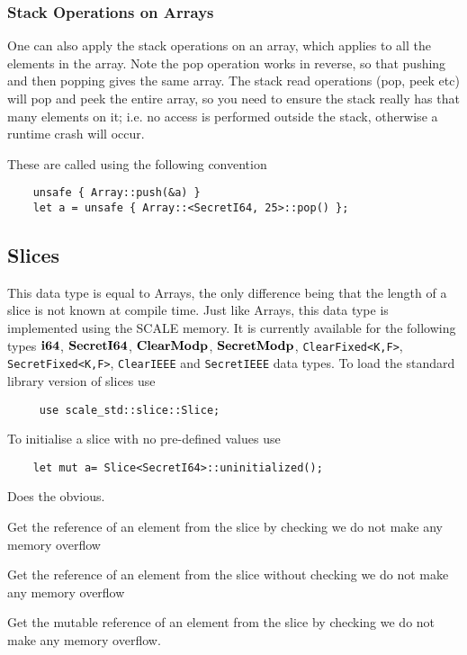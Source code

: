 \subsubsection{Stack Operations on Arrays}
One can also apply the stack operations on an array, which
applies to all the elements in the array.
Note the pop operation works in reverse, so that pushing and
then popping gives the same array.
The stack read operations (pop, peek etc) will pop and peek
the entire array, so you need to ensure the stack really has
that many elements on it; i.e. no access is performed outside
the stack, otherwise a runtime crash will occur.

These are called using the following convention
\begin{lstlisting}
    unsafe { Array::push(&a) }
    let a = unsafe { Array::<SecretI64, 25>::pop() };
\end{lstlisting}

\subsection{Slices}
\label{sec:slices}
This data type is equal to Arrays, the only difference being that the length of a slice is not known at compile time.
Just like Arrays, this data type is implemented using the SCALE memory.
It is currently available for the following types
$\mathbf{i64}$, $\mathbf{SecretI64}$, $\mathbf{ClearModp}$, $\mathbf{SecretModp}$,
\verb|ClearFixed<K,F>|, \verb|SecretFixed<K,F>|,
\verb|ClearIEEE| and \verb|SecretIEEE|
data types.
To load the standard library version of slices use
\begin{lstlisting}
     use scale_std::slice::Slice;
\end{lstlisting}

To initialise a slice with no pre-defined values use
\begin{lstlisting}
    let mut a= Slice<SecretI64>::uninitialized();
\end{lstlisting}

Does the obvious.


Get the reference of an element from the slice by checking we do not make any memory overflow

Get the reference of an element from the slice without checking we do not make any memory overflow

Get the mutable reference of an element from the slice by checking we do not make any memory overflow.

